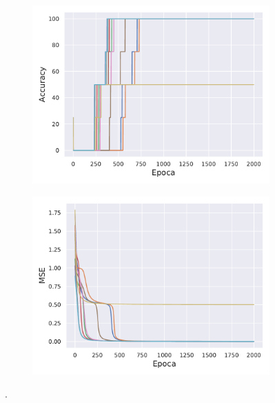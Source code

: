 \begin{figure}[h!]
    \centering
    \begin{subfigure}[h]{0.49\textwidth} 
        \includegraphics[width=\textwidth]{Figuras/ej1_1erArquitectura/Acc.pdf}
    \end{subfigure}       
    \begin{subfigure}[h]{0.49\textwidth} 
        \includegraphics[width=\textwidth]{Figuras/ej1_1erArquitectura/Loss.pdf}
    \end{subfigure}
    \caption{.} \label{fig:1_1erArquitectura}
\end{figure}




